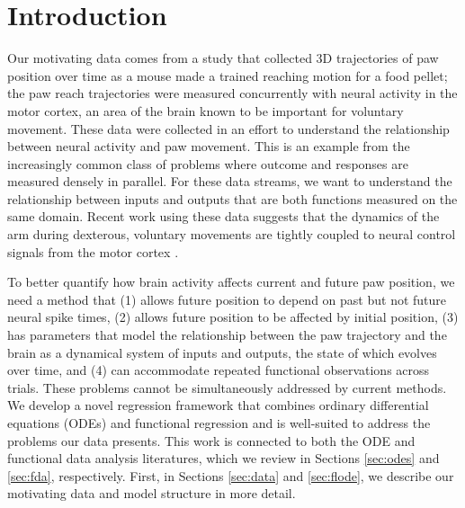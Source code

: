 \documentclass[preprint]{JASA}
\begin{document}

\maketitle




\hypertarget{introduction}{%
\section{Introduction}\label{introduction}}

\label{sec:intro}

Our motivating data comes from a study that collected 3D trajectories of
paw position over time as a mouse made a trained reaching motion for a
food pellet; the paw reach trajectories were measured concurrently with
neural activity in the motor cortex, an area of the brain known to be
important for voluntary movement. These data were collected in an effort
to understand the relationship between neural activity and paw movement.
This is an example from the increasingly common class of problems where
outcome and responses are measured densely in parallel. For these data
streams, we want to understand the relationship between inputs and
outputs that are both functions measured on the same domain. Recent work
using these data suggests that the dynamics of the arm during dexterous,
voluntary movements are tightly coupled to neural control signals from
the motor cortex \citep{guo2015, sauerbrei2018}.

To better quantify how brain activity affects current and future paw
position, we need a method that (1) allows future position to depend on
past but not future neural spike times, (2) allows future position to be
affected by initial position, (3) has parameters that model the
relationship between the paw trajectory and the brain as a dynamical
system of inputs and outputs, the state of which evolves over time, and
(4) can accommodate repeated functional observations across trials.
These problems cannot be simultaneously addressed by current methods. We
develop a novel regression framework that combines ordinary differential
equations (ODEs) and functional regression and is well-suited to address
the problems our data presents. This work is connected to both the ODE
and functional data analysis literatures, which we review in Sections
\ref{sec:odes} and \ref{sec:fda}, respectively. First, in Sections
\ref{sec:data} and \ref{sec:flode}, we describe our motivating data and
model structure in more detail.
\end{document}
